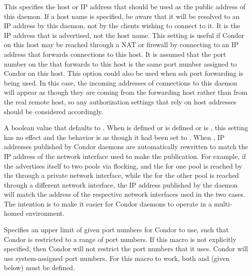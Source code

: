 \begin{description}
\label{param:TcpForwardingHost}
\item[\Macro{TCP\_FORWARDING\_HOST}]
  This specifies the host or IP address that should be used as the
  public address of this daemon.  If a host name is specified, be aware
  that it will be resolved to an IP address by this daemon, not by the clients
  wishing to connect to it.  It is the IP address that is advertised, not
  the host name.  This setting is useful if Condor on this
  host may be reached through a NAT or firewall by connecting to an
  IP address that forwards connections to this host.  It
  is assumed that the port number on the 
  that forwards to this host is the same port number assigned to
  Condor on this host.  This option could also be used when ssh port
  forwarding is being used.  In this case, the incoming addresses
  of connections to this daemon will appear as though they are coming
  from the forwarding host rather than from the real remote host, so any
  authorization settings that rely on host addresses should be
  considered accordingly.

\label{param:EnableAddressRewriting}
\item[\Macro{ENABLE\_ADDRESS\_REWRITING}]
  A boolean value that defaults to .  When
   is defined or
   is defined or
   is , this setting has no effect and
  the behavior is as though it had been set to .  When ,
  IP addresses published by Condor daemons are automatically rewritten to
  match the IP address of the network interface used to make the
  publication.  For example, if the  advertises itself to
  two pools via flocking, and the  for one pool is reached
  by the  through a private network interface, while
  the  for the other pool is reached through a different
  network interface, the IP address published by the 
  daemon will match the address of the respective network interfaces
  used in the two cases.  The intention is to make it easier for
  Condor daemons to operate in a multi-homed environment.

\label{param:HighPort}
\item[\Macro{HIGHPORT}]
  Specifies an upper limit of given port numbers for Condor to use,
  such that Condor is restricted to a range of port numbers.
  If this macro is not explicitly specified, then Condor will
  not restrict the port numbers that it uses. Condor will use
  system-assigned port numbers.
  For this macro to work, both  and
   (given below) must be defined.


\end{description}
